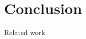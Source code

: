 \documentclass{easychair}
\newcommand{\jan}[1]{{\color{red} #1}}
\theoremstyle{definition}
\begin{document}
\section{Conclusion}
\label{sect:conclusion}

\jan{Related work}

\label{sect:bib}

%
%
%


\appendix



\end{document}

